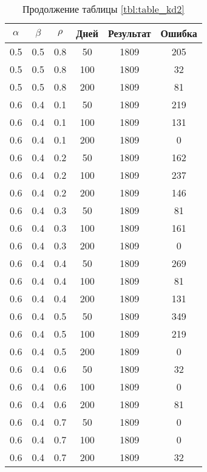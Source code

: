 \begin{table}[h]
	\begin{center}
        \begin{threeparttable}
        \captionsetup{justification=raggedright,singlelinecheck=off}
		\caption*{Продолжение таблицы \ref{tbl:table_kd2}}
		\begin{tabular}{|c|c|c|c|c|c|}
  	\hline
	$\alpha$ & $\beta$ & $\rho$ & Дней & Результат & Ошибка \\\hline
		0.5 &  0.5 &  0.8 &   50 &  1809 &   205 \\
		0.5 &  0.5 &  0.8 &  100 &  1809 &    32 \\
		0.5 &  0.5 &  0.8 &  200 &  1809 &    81 \\
	   \hline
		0.6 &  0.4 &  0.1 &   50 &  1809 &   219 \\
		0.6 &  0.4 &  0.1 &  100 &  1809 &   131 \\
		0.6 &  0.4 &  0.1 &  200 &  1809 &     0 \\
	   \hline
		0.6 &  0.4 &  0.2 &   50 &  1809 &   162 \\
		0.6 &  0.4 &  0.2 &  100 &  1809 &   237 \\
		0.6 &  0.4 &  0.2 &  200 &  1809 &   146 \\
	   \hline
		0.6 &  0.4 &  0.3 &   50 &  1809 &    81 \\
		0.6 &  0.4 &  0.3 &  100 &  1809 &   161 \\
		0.6 &  0.4 &  0.3 &  200 &  1809 &     0 \\
	   \hline
		0.6 &  0.4 &  0.4 &   50 &  1809 &   269 \\
		0.6 &  0.4 &  0.4 &  100 &  1809 &    81 \\
		0.6 &  0.4 &  0.4 &  200 &  1809 &   131 \\
	   \hline
		0.6 &  0.4 &  0.5 &   50 &  1809 &   349 \\
		0.6 &  0.4 &  0.5 &  100 &  1809 &   219 \\
		0.6 &  0.4 &  0.5 &  200 &  1809 &     0 \\
	   \hline
		0.6 &  0.4 &  0.6 &   50 &  1809 &    32 \\
		0.6 &  0.4 &  0.6 &  100 &  1809 &     0 \\
		0.6 &  0.4 &  0.6 &  200 &  1809 &    81 \\
	   \hline
		0.6 &  0.4 &  0.7 &   50 &  1809 &     0 \\
		0.6 &  0.4 &  0.7 &  100 &  1809 &     0 \\
		0.6 &  0.4 &  0.7 &  200 &  1809 &    32 \\

\end{tabular}
\end{threeparttable}
\end{center}
\end{table}

